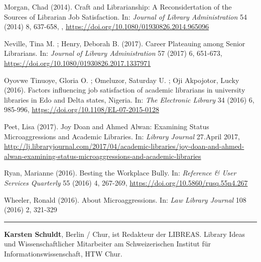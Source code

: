 \documentclass[a4paper,
fontsize=11pt,
oneside,
numbers=noperiodatend,
parskip=half-,
bibliography=totoc,
final
]{scrartcl}
\begin{document}
Morgan, Chad (2014). Craft and Librarianship: A Reconsidertation of the
Sources of Librarian Job Satisfaction. In: \emph{Journal of Library
Administration} 54 (2014) 8, 637-658, ,
\url{https://doi.org/10.1080/01930826.2014.965096}

Neville, Tina M. ; Henry, Deborah B. (2017). Career Plateauing among
Senior Librarians. In: \emph{Journal of Library Administration} 57
(2017) 6, 651-673, \url{https://doi.org/10.1080/01930826.2017.1337971}

Oyovwe Tinuoye, Gloria O. ; Omeluzor, Saturday U. ; Oji Akpojotor, Lucky
(2016). Factors influencing job satisfaction of academic librarians in
university libraries in Edo and Delta states, Nigeria. In: \emph{The
Electronic Library} 34 (2016) 6, 985-996,
\url{https://doi.org/10.1108/EL-07-2015-0128}

Peet, Lisa (2017). Joy Doan and Ahmed Alwan: Examining Status
Microaggressions and Academic Libraries. In: \emph{Library Journal}
27.April 2017,
\url{http://lj.libraryjournal.com/2017/04/academic-libraries/joy-doan-and-ahmed-alwan-examining-status-microaggressions-and-academic-libraries}

Ryan, Marianne (2016). Besting the Workplace Bully. In: \emph{Reference
\& User Services Quarterly} 55 (2016) 4, 267-269,
\url{https://doi.org/10.5860/rusq.55n4.267}

Wheeler, Ronald (2016). About Microaggressions. In: \emph{Law Library
Journal} 108 (2016) 2, 321-329

\begin{center}\rule{0.5\linewidth}{\linethickness}\end{center}

\textbf{Karsten Schuldt}, Berlin / Chur, ist Redakteur der LIBREAS.
Library Ideas und Wissenschaftlicher Mitarbeiter am Schweizerischen
Institut für Informationswissenschaft, HTW Chur.
\end{document}
